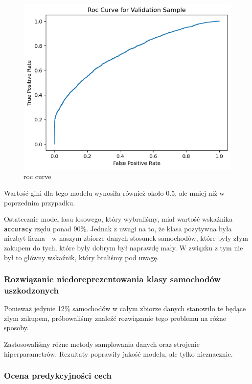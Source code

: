 \documentclass[11pt]{article}
\begin{document}
\begin{figure}
\centering
\includegraphics{plots/RF_random_roc.png}
\caption{roc curve}
\end{figure}

Wartość gini dla tego modelu wynosiła również około 0.5, ale mniej niż w
poprzednim przypadku.

Ostatecznie model lasu losowego, który wybraliśmy, miał wartość
wskaźnika \texttt{accuracy} rzędu ponad 90\%. Jednak z uwagi na to, że
klasa pozytywna była niezbyt liczna - w naszym zbiorze danych stosunek
samochodów, które były złym zakupem do tych, które były dobrym był
naprawdę mały. W związku z tym nie był to główny wskaźnik, który
braliśmy pod uwagę.

\hypertarget{rozwiux105zanie-niedoreprezentowania-klasy-samochoduxf3w-uszkodzonych}{%
\subsubsection{Rozwiązanie niedoreprezentowania klasy samochodów
uszkodzonych}\label{rozwiux105zanie-niedoreprezentowania-klasy-samochoduxf3w-uszkodzonych}}

Ponieważ jedynie 12\% samochodów w całym zbiorze danych stanowiło te
będące złym zakupem, próbowaliśmy znaleźć rozwiązanie tego problemu na
różne sposoby.

Zastosowaliśmy różne metody samplowania danych oraz strojenie
hiperparametrów. Rezultaty poprawiły jakość modelu, ale tylko
nieznacznie.

\hypertarget{ocena-predykcyjnoux15bci-cech}{%
\subsubsection{Ocena predykcyjności
cech}\label{ocena-predykcyjnoux15bci-cech}}
\end{document}
